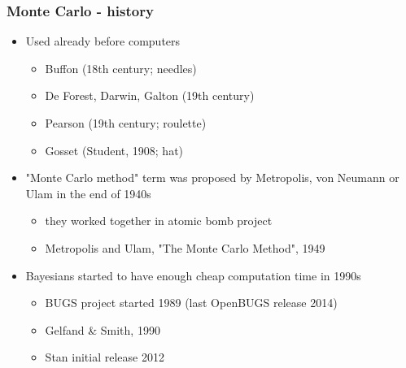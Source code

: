 \documentclass[10pt]{beamer}
\begin{document}

\begin{frame}
\frametitle{Monte Carlo - history}

  \begin{itemize}
  \item Used already before computers
    \begin{itemize}
      \item Buffon (18th century; needles)
      \item De Forest, Darwin, Galton (19th century)
      \item Pearson (19th century; roulette)
      \item Gosset (Student, 1908; hat)
    \end{itemize}
    \pause
  \item "Monte Carlo method" term was proposed by Metropolis, von Neumann
    or Ulam in the end of 1940s
     \begin{itemize}
     \item they worked together in atomic bomb project
     \item Metropolis and Ulam, "The Monte Carlo Method", 1949
     \end{itemize}
    \pause
   \item Bayesians started to have enough cheap computation time in 1990s
     \begin{itemize}
     \item BUGS project started 1989 (last OpenBUGS release 2014)
     \item Gelfand \& Smith, 1990
     \item Stan initial release 2012
     \end{itemize}
  \end{itemize}

\end{frame}
\end{document}
